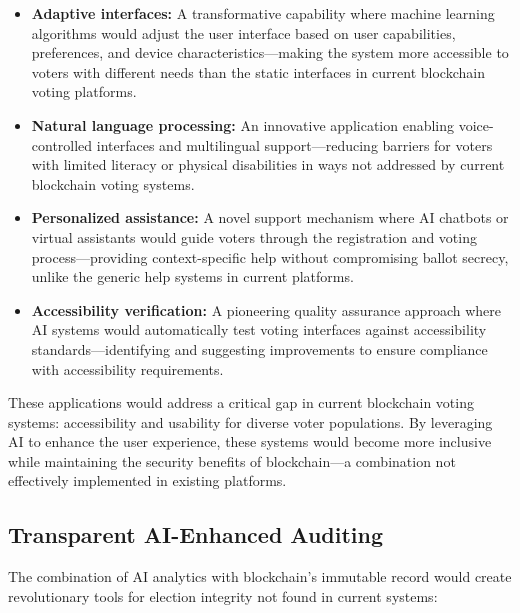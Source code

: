 \documentclass[conference]{IEEEtran}
\begin{document}
\begin{itemize}
    \item \textbf{Adaptive interfaces:} A transformative capability where machine learning algorithms would adjust the user interface based on user capabilities, preferences, and device characteristics—making the system more accessible to voters with different needs than the static interfaces in current blockchain voting platforms.
    
    \item \textbf{Natural language processing:} An innovative application enabling voice-controlled interfaces and multilingual support—reducing barriers for voters with limited literacy or physical disabilities in ways not addressed by current blockchain voting systems.
    
    \item \textbf{Personalized assistance:} A novel support mechanism where AI chatbots or virtual assistants would guide voters through the registration and voting process—providing context-specific help without compromising ballot secrecy, unlike the generic help systems in current platforms.
    
    \item \textbf{Accessibility verification:} A pioneering quality assurance approach where AI systems would automatically test voting interfaces against accessibility standards—identifying and suggesting improvements to ensure compliance with accessibility requirements.
\end{itemize}

These applications would address a critical gap in current blockchain voting systems: accessibility and usability for diverse voter populations. By leveraging AI to enhance the user experience, these systems would become more inclusive while maintaining the security benefits of blockchain—a combination not effectively implemented in existing platforms.

\subsection{Transparent AI-Enhanced Auditing}
The combination of AI analytics with blockchain's immutable record would create revolutionary tools for election integrity not found in current systems:
\end{document}
